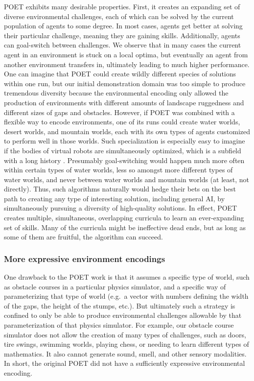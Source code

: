 \documentclass{article}
\begin{document}
POET exhibits many desirable properties. First, it creates an expanding set of diverse environmental challenges, each of which can be solved by the current population of agents to some degree. In most cases, agents get better at solving their particular challenge, meaning they are gaining skills. Additionally, agents can goal-switch between challenges. We observe that in many cases the current agent in an environment is stuck on a local optima, but eventually an agent from another environment transfers in, ultimately leading to much higher performance. One can imagine that POET could create wildly different species of solutions within one run, but our initial demonstration domain was too simple to produce tremendous diversity because the environmental encoding only allowed the production of environments with different amounts of landscape ruggedness and different sizes of gaps and obstacles. However, if POET was combined with a flexible way to encode environments, one of its runs could create water worlds, desert worlds, and mountain worlds, each with its own types of agents customized to perform well in those worlds. Such specialization is especially easy to imagine if the bodies of virtual robots are simultaneously optimized, which is a subfield with a long history \cite{sims1994evolving,cheney2013unshackling,cheney:alife14,hornby2002creating,auerbach:bodybrain,ha2018evolveBodies}. Presumably goal-switching would happen much more often within certain types of water worlds, less so amongst more different types of water worlds, and never between water worlds and mountain worlds (at least, not directly). Thus, such algorithms naturally would hedge their bets on the best path to creating any type of interesting solution, including general AI, by simultaneously pursuing a diversity of high-quality solutions. In effect, POET creates multiple, simultaneous, overlapping curricula to learn an ever-expanding set of skills. Many of the curricula might be ineffective dead ends, but as long as some of them are fruitful, the algorithm can succeed. 

\subsubsection{More expressive environment encodings}

One drawback to the POET work is that it assumes a specific type of world, such as obstacle courses in a particular physics simulator, and a specific way of parameterizing that type of world (e.g.\ a vector with numbers defining the width of the gaps, the height of the stumps, etc.). But ultimately such a strategy is confined to only be able to produce environmental challenges allowable by that parameterization of that physics simulator. For example, our obstacle course simulator does not allow the creation of many types of challenges, such as doors, tire swings, swimming worlds, playing chess, or needing to learn different types of mathematics. It also cannot generate sound, smell, and other sensory modalities. In short, the original POET did not have a sufficiently expressive environmental encoding. 
\end{document}
